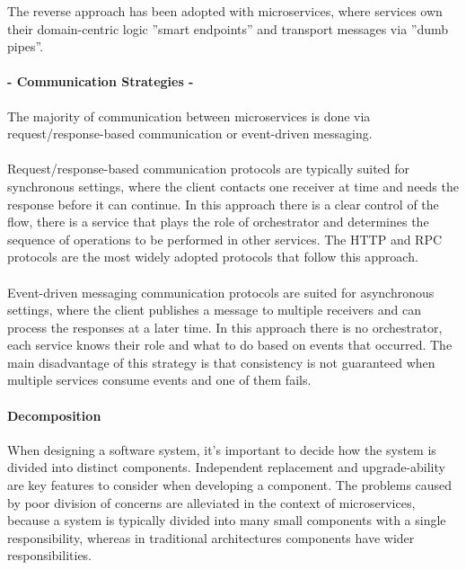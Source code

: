 The reverse approach has been adopted with microservices,
where services own their domain-centric logic ''smart endpoints'' and transport messages via ''dumb pipes''.

\paragraph{- Communication Strategies -}
The majority of communication between microservices is done via request/response-based communication or event-driven messaging.

\paragraph{}

Request/response-based communication protocols are typically suited for synchronous settings,
where the client contacts one receiver at time and needs the response before it can continue.
In this approach there is a clear control of the flow,
there is a service that plays the role of orchestrator and determines the sequence of operations to be performed in other services.
The HTTP and RPC protocols are the most widely adopted protocols that follow this approach.

\paragraph{}

Event-driven messaging communication protocols are suited for asynchronous settings,
where the client publishes a message to multiple receivers and can process the responses at a later time.
In this approach there is no orchestrator, each service knows their role and what to do based on events that occurred.
The main disadvantage of this strategy is that consistency is not guaranteed when multiple services consume events and one of them fails.

\paragraph{Decomposition}
When designing a software system, it's important to decide how the system is divided into distinct components.
Independent replacement and upgrade-ability are key features to consider when developing a component.
The problems caused by poor division of concerns are alleviated in the context of microservices, because a system is typically divided into many small components with a single responsibility,
whereas in traditional architectures components have wider responsibilities.

